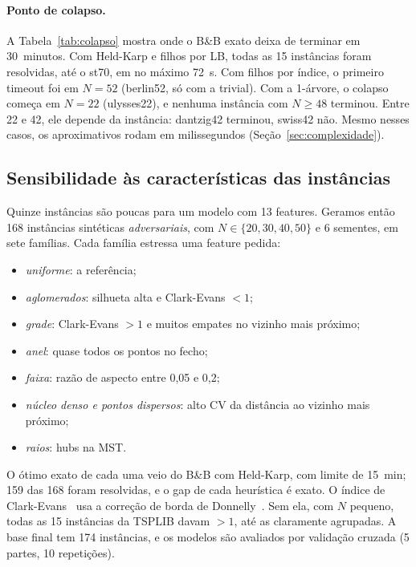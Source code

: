 \paragraph{Ponto de colapso.} A Tabela~\ref{tab:colapso} mostra onde o
B\&B exato deixa de terminar em 30~minutos. Com Held-Karp e filhos por LB,
todas as 15 instâncias foram resolvidas, até o st70, em no máximo 72~s. Com
filhos por índice, o primeiro timeout foi em $N=52$ (berlin52, só com a
trivial). Com a 1-árvore, o colapso começa em $N=22$ (ulysses22), e
nenhuma instância com $N\ge48$ terminou. Entre 22 e 42, ele depende da
instância: dantzig42 terminou, swiss42 não. Mesmo nesses casos, os
aproximativos rodam em milissegundos (Seção~\ref{sec:complexidade}).




\subsection{Sensibilidade às características das instâncias}\label{sec:sens}

Quinze instâncias são poucas para um modelo com 13 features. Geramos então
168 instâncias sintéticas \emph{adversariais}, com $N\in\{20,30,40,50\}$ e 6
sementes, em sete famílias. Cada família estressa uma feature pedida:
\begin{itemize}
  \item \emph{uniforme}: a referência;
  \item \emph{aglomerados}: silhueta alta e Clark-Evans $<1$;
  \item \emph{grade}: Clark-Evans $>1$ e muitos empates no vizinho mais
    próximo;
  \item \emph{anel}: quase todos os pontos no fecho;
  \item \emph{faixa}: razão de aspecto entre 0,05 e 0,2;
  \item \emph{núcleo denso e pontos dispersos}: alto CV da distância ao
    vizinho mais próximo;
  \item \emph{raios}: hubs na MST.
\end{itemize}
O ótimo exato de cada uma veio do B\&B com Held-Karp, com limite de 15~min;
159 das 168 foram resolvidas, e o gap de cada heurística é exato. O
índice de Clark-Evans~\cite{clarkevans1954} usa a correção de borda de
Donnelly~\cite{donnelly1978}. Sem ela, com $N$ pequeno, todas as 15
instâncias da TSPLIB davam $>1$, até as claramente agrupadas. A base final
tem 174 instâncias, e os modelos são avaliados por validação cruzada
(5 partes, 10 repetições).

